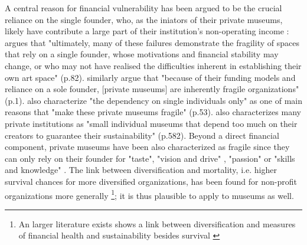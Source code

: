 \documentclass[12pt]{article}
\begin{document}
A central reason for financial vulnerability has been argued to be the crucial reliance on the single founder, who, as the iniators of their private museums, likely have contribute a large part of their institution's non-operating income \parencite{Frey_Meier_2002_beyeler}:
\textcite{Adam_2021_rise} argues that "ultimately, many of these failures demonstrate the fragility of spaces that rely on a single founder, whose motivations and financial stability may change, or who may not have realised the difficulties inherent in establishing their own art space" (p.82).
\textcite{Velthuis_Gera_2024_fragility} similarly argue that "because of their funding models and reliance on a sole founder, [private museums] are inherently fragile organizations" (p.1).
\textcite{Bechtler_Imhof_2018_future} also characterize "the dependency on single individuals only" as one of main reasons that "make these private museums fragile" (p.53).
\cite{StylianouLambert_etal_2014_museums} also characterizes many private institutions as "small individual museums that depend too much on their creators to guarantee their sustainability" (p.582).
Beyond a direct financial component, private museums have been also
characterized as fragile since they can only rely on their founder for "taste", "vision and drive" \parencite[p.77]{Adam_2021_rise}, "passion" \parencite[p.234]{Walker_2019_collector} or "skills and knowledge" \parencite[p.580]{StylianouLambert_etal_2014_museums}.
The link between diversification and mortality, i.e. higher survival chances for more diversified organizations, has been found for non-profit organizations more generally \parencite{Fernandez_2007_dissolution,Bielefeld_1994_survival,Hager_2001_vulnerability,Lu_Shon_Zhang_2019_dissolution}\footnote{An larger literature exists shows a link between diversification and measures of financial health and sustainability besides survival \parencite{Licci_BaraldiBonini_2024_sustainability}}; it is thus plausible to apply to museums as well.
\end{document}
